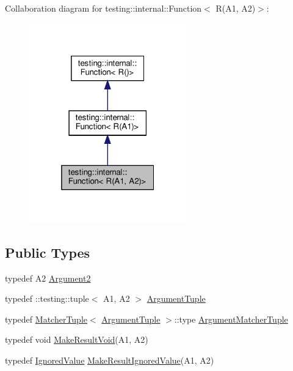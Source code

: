 Collaboration diagram for testing\+:\+:internal\+:\+:Function$<$ R(A1, A2)$>$\+:
\nopagebreak
\begin{figure}[H]
\begin{center}
\leavevmode
\includegraphics[width=193pt]{structtesting_1_1internal_1_1_function_3_01_r_07_a1_00_01_a2_08_4__coll__graph}
\end{center}
\end{figure}
\subsection*{Public Types}
\begin{DoxyCompactItemize}
\item 
typedef A2 \hyperlink{structtesting_1_1internal_1_1_function_3_01_r_07_a1_00_01_a2_08_4_a025f5192252366d73aa19718bb0ea89d}{Argument2}
\item 
typedef \+::testing\+::tuple$<$ A1, A2 $>$ \hyperlink{structtesting_1_1internal_1_1_function_3_01_r_07_a1_00_01_a2_08_4_a2de00437877c29ec6cb78396928b8e3e}{Argument\+Tuple}
\item 
typedef \hyperlink{structtesting_1_1internal_1_1_matcher_tuple}{Matcher\+Tuple}$<$ \hyperlink{structtesting_1_1internal_1_1_function_3_01_r_07_08_4_ad483c3128c470d8cdb55c3ac1c575c11}{Argument\+Tuple} $>$\+::type \hyperlink{structtesting_1_1internal_1_1_function_3_01_r_07_a1_00_01_a2_08_4_ad07042129ff6370f55a279ad12f5e80f}{Argument\+Matcher\+Tuple}
\item 
typedef void \hyperlink{structtesting_1_1internal_1_1_function_3_01_r_07_a1_00_01_a2_08_4_ada1ad22fa21c84ec3faea47ed20c1b46}{Make\+Result\+Void}(A1, A2)
\item 
typedef \hyperlink{classtesting_1_1internal_1_1_ignored_value}{Ignored\+Value} \hyperlink{structtesting_1_1internal_1_1_function_3_01_r_07_a1_00_01_a2_08_4_a89033ea870fe831b13899ce36666e102}{Make\+Result\+Ignored\+Value}(A1, A2)
\end{DoxyCompactItemize}


